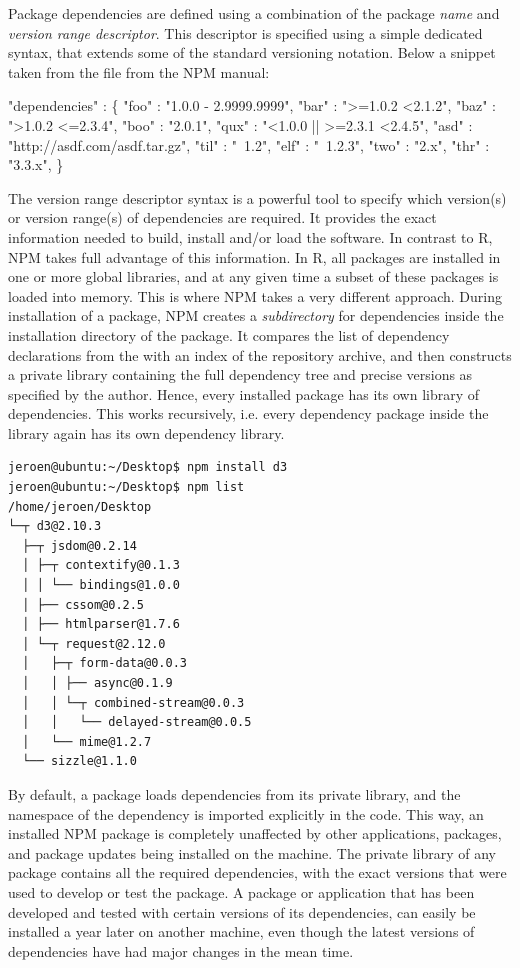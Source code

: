 Package dependencies are defined using a combination of the package \emph{name}
and \emph{version range descriptor}. This descriptor is specified using a
simple dedicated syntax, that extends some of the standard versioning notation.
Below a snippet taken from the  file from the NPM manual:

\begin{example}
   "dependencies" : \{
      "foo" : "1.0.0 - 2.9999.9999",
      "bar" : ">=1.0.2 <2.1.2",
      "baz" : ">1.0.2 <=2.3.4",
      "boo" : "2.0.1",
      "qux" : "<1.0.0 || >=2.3.1 <2.4.5",
      "asd" : "http://asdf.com/asdf.tar.gz",
      "til" : "~1.2",
      "elf" : "~1.2.3",
      "two" : "2.x",
      "thr" : "3.3.x",
   \}
\end{example}

\noindent The version range descriptor syntax is a powerful tool to specify
which version(s) or version range(s) of dependencies are required. It provides the exact
information needed to build, install and/or load the software. In contrast to R,
NPM takes full advantage of this information. In R, all packages are installed
in one or more global libraries, and at any given time a subset of these packages
is loaded into memory. This is where NPM takes a very different approach. During
installation of a package, NPM creates a \emph{subdirectory} for dependencies inside
the installation directory of the package. It compares the list of dependency
declarations from the  with an index of the repository archive,
and then constructs a private library containing the full dependency tree and precise
versions as specified by the author. Hence, every installed package has its own library
of dependencies. This works recursively, i.e. every dependency package inside
the library again has its own dependency library.

\begin{verbatim}
jeroen@ubuntu:~/Desktop$ npm install d3
jeroen@ubuntu:~/Desktop$ npm list
/home/jeroen/Desktop
└─┬ d3@2.10.3
  ├─┬ jsdom@0.2.14
  │ ├─┬ contextify@0.1.3
  │ │ └── bindings@1.0.0
  │ ├── cssom@0.2.5
  │ ├── htmlparser@1.7.6
  │ └─┬ request@2.12.0
  │   ├─┬ form-data@0.0.3
  │   │ ├── async@0.1.9
  │   │ └─┬ combined-stream@0.0.3
  │   │   └── delayed-stream@0.0.5
  │   └── mime@1.2.7
  └── sizzle@1.1.0
\end{verbatim}

\noindent By default, a package loads dependencies from its private library, and
the namespace of the dependency is imported explicitly in the code. This way, an
installed NPM package is completely unaffected by other applications, packages,
and package updates being installed on the machine. The private library of any
package contains all the required dependencies, with the exact versions that
were used to develop or test the package. A package or application that
has been developed and tested with certain versions of its dependencies, can
easily be installed a year later on another machine, even though the latest
versions of dependencies have had major changes in the mean time.


